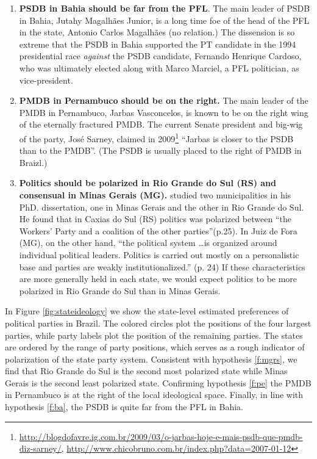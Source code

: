 \begin{enumerate}
\item \label{f:ba} \textbf{PSDB in Bahia should be far from the PFL}. The main leader of PSDB in Bahia, Jutahy Magalhães Junior, is a long time foe of the head  of the  PFL in the state, Antonio Carlos Magalhães (no relation.) The dissension is so extreme that the PSDB in Bahia supported the PT candidate in the 1994 presidential race \emph{against} the PSDB candidate, Fernando Henrique Cardoso, who was ultimately elected along with Marco Marciel, a PFL politician,  as vice-president. 

\item \label{f:pe} \textbf{PMDB in Pernambuco should be on the right.} The main leader of the PMDB in Pernambuco, Jarbas Vasconcelos, is known to be on the right wing of the eternally fractured PMDB. The current Senate president and big-wig of the party, José Sarney, claimed in 2009\footnote{\url{http://blogdofavre.ig.com.br/2009/03/o-jarbas-hoje-e-mais-psdb-que-pmdb-diz-sarney/}, \url{http://www.chicobruno.com.br/index.php?data=2007-01-12}} ``Jarbas is closer to the PSDB than to the PMDB''. (The PSDB is usually placed to the right of PMDB in Braizl.)


\item \label{f:mgrs} \textbf{Politics should be polarized in Rio Grande do Sul (RS) and consensual in Minas Gerais (MG).} \citet{renno:2004} studied two  municipalities in his PhD. dissertation, one in  Minas Gerais  and the other in Rio Grande do Sul. He found that in Caxias do Sul (RS)  politics was polarized  between ``the Workers’ Party and a coalition of the other parties''(p.25).  In Juiz de Fora (MG), on the other hand,   ``the political system \dots is organized around individual political leaders.  Politics is carried out mostly on a personalistic base and parties are weakly institutionalized.'' (p. 24) If these characteristics are more generally held in each state, we would expect politics to be more polarized in Rio Grande do Sul than in Minas Gerais. 
\end{enumerate}

In Figure \ref{fig:stateideology} we show the state-level estimated preferences of political parties in Brazil. The colored circles plot the positions of the four largest parties, while party labels plot the position of the remaining parties. The states are ordered by the range of party positions, which serves as a rough indicator of polarization of the state party system.  Consistent with hypothesis   \ref{f:mgrs}, we find that Rio Grande do Sul  is the second most polarized state while Minas Gerais is the second least polarized state. Confirming hypothesis \ref{f:pe}  the PMDB in Pernambuco is at the right of the local ideological space. Finally, in line with hypothesis \ref{f:ba},   the PSDB  is quite far from the PFL in Bahia.  

